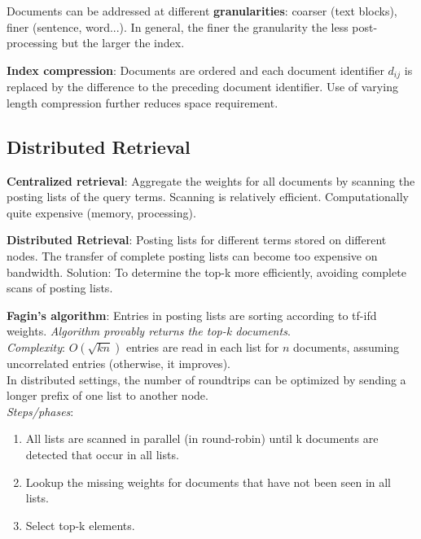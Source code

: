     Documents can be addressed at different \textbf{granularities}: coarser (text blocks), finer (sentence, word...). In general, the finer the granularity the less post-processing but the larger the index.

    \textbf{Index compression}: Documents are ordered and each document identifier $d_{ij}$ is replaced by the difference to the preceding document identifier. Use of varying length compression further reduces space requirement.

  \subsection{Distributed Retrieval} %
  \label{sub:distributed_retrieval}
    \textbf{Centralized retrieval}: Aggregate the weights for all documents by scanning the posting lists of the query terms. Scanning is relatively efficient. Computationally quite expensive (memory, processing).

    \textbf{Distributed Retrieval}: Posting lists for different terms stored on different nodes. The transfer of complete posting lists can become too expensive on bandwidth. Solution: To determine the top-k more efficiently, avoiding complete scans of posting lists.

    \textbf{Fagin's algorithm}: Entries in posting lists are sorting according to tf-ifd weights. \emph{Algorithm provably returns the top-k documents}.\\
    \emph{Complexity}: $O(\sqrt{kn})$ entries are read in each list for $n$ documents, assuming uncorrelated entries (otherwise, it improves).\\
    In distributed settings, the number of roundtrips can be optimized by sending a longer prefix of one list to another node.\\
    \emph{Steps/phases}:
    \begin{enumerate}
      \item All lists are scanned in parallel (in round-robin) until k documents are detected that occur in all lists.
      \item Lookup the missing weights for documents that have not been seen in all lists.
      \item Select top-k elements.
    \end{enumerate}


